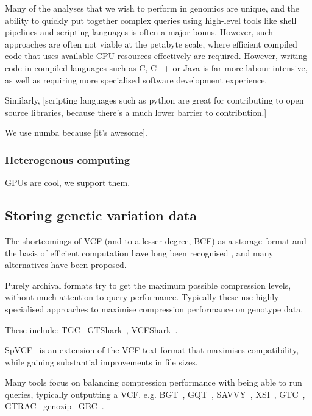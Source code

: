 \documentclass[9pt,lineno]{elife}
\begin{document}
Many of the analyses that we wish to perform in genomics are unique,
and the ability to quickly put together complex queries using
high-level tools like shell pipelines and scripting languages
is often a major bonus. However, such approaches are often not
viable at the petabyte scale, where efficient compiled code that
uses available CPU resources effectively are required. However,
writing code in compiled languages such as C, C++ or Java
is far more labour intensive, as well as requiring more specialised
software development experience.

Similarly, [scripting languages such as python are great for
contributing to open source libraries, because there's a much
lower barrier to contribution.]

We use numba because [it's awesome].

\subsubsection{Heterogenous computing}

GPUs are cool, we support them.


\subsection{Storing genetic variation data}
The shortcomings of VCF (and to a lesser degree, BCF) as a storage
format and the basis of efficient computation have long been
recognised \citep[e.g.][]{kelleher2013processing,layer2016efficient,li2016bgt},
and many alternatives
have been proposed.

Purely archival formats try to get the maximum possible compression levels,
without much attention to query performance. Typically these use
highly specialised approaches to maximise compression performance
on genotype data.

These include:
TGC~\citep{deorowicz2013genome}
GTShark~\citep{deorowicz2019gtshark},
VCFShark~\citep{deorowicz2021vcfshark}.

SpVCF~\citep{lin2020sparse} is an extension of the VCF text
format that maximises compatibility, while gaining substantial
improvements in file sizes.

Many tools focus on balancing compression performance with
being able to run queries, typically outputting a VCF.
e.g.
BGT~\citep{li2016bgt},
GQT~\citep{layer2016efficient},
SAVVY~\citep{lefaive2021sparse},
XSI~\citep{wertenbroek2022xsi},
GTC~\citep{danek2018gtc},
GTRAC~\citep{tatwawadi2016gtrac}
genozip~\citep{lan2020genozip,lan2021genozip}
GBC~\citep{zhang2023gbc}.
\end{document}
